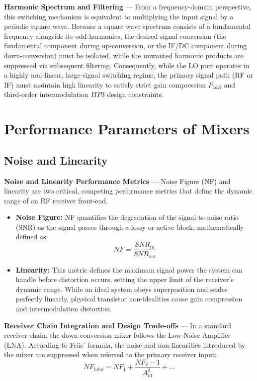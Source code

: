 \textbf{Harmonic Spectrum and Filtering} --- From a frequency-domain perspective, this switching mechanism is equivalent to multiplying the input signal by a periodic square wave. Because a square wave spectrum consists of a fundamental frequency alongside its odd harmonics, the desired signal conversion (the fundamental component during up-conversion, or the IF/DC component during down-conversion) must be isolated, while the unwanted harmonic products are suppressed via subsequent filtering. Consequently, while the LO port operates in a highly non-linear, large-signal switching regime, the primary signal path (RF or IF) must maintain high linearity to satisfy strict gain compression $P_{1dB}$ and third-order intermodulation $IIP3$ design constraints.

\section{Performance Parameters of Mixers}

\subsection{Noise and Linearity}

\textbf{Noise and Linearity Performance Metrics} --- Noise Figure (NF) and linearity are two critical, competing performance metrics that define the dynamic range of an RF receiver front-end.

\begin{itemize}
    \item \textbf{Noise Figure:} NF quantifies the degradation of the signal-to-noise ratio (SNR) as the signal passes through a lossy or active block, mathematically defined as:
\begin{equation}
NF = \frac{SNR_{in}}{SNR_{out}}
\end{equation}
    \item \textbf{Linearity:} This metric defines the maximum signal power the system can handle before distortion occurs, setting the upper limit of the receiver's dynamic range. While an ideal system obeys superposition and scales perfectly linearly, physical transistor non-idealities cause gain compression and intermodulation distortion.
\end{itemize}

\textbf{Receiver Chain Integration and Design Trade-offs} --- In a standard receiver chain, the down-conversion mixer follows the Low-Noise Amplifier (LNA). According to Friis' formula, the noise and non-linearities introduced by the mixer are suppressed when referred to the primary receiver input:
\begin{equation}
NF_{total} = NF_1 + \frac{NF_2 - 1}{A_{v1}^2} + \ldots
\end{equation}

